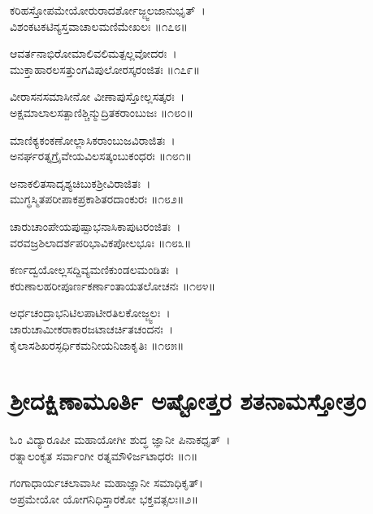	ಕರಿಹಸ್ತೋಪಮೇಯೋರುರಾದರ್ಶೋಜ್ಜ್ವಲಜಾನುಭೃತ್~।\\
	ವಿಶಂಕಟಕಟಿನ್ಯಸ್ತವಾಚಾಲಮಣಿಮೇಖಲಃ ॥೧೭೮॥

ಆವರ್ತನಾಭಿರೋಮಾಲಿವಲಿಮತ್ಪಲ್ಲವೋದರಃ~।\\
ಮುಕ್ತಾಹಾರಲಸತ್ತುಂಗವಿಪುಲೋರಸ್ಕರಂಜಿತಃ ॥೧೭೯॥

	ವೀರಾಸನಸಮಾಸೀನೋ ವೀಣಾಪುಸ್ತೋಲ್ಲಸತ್ಕರಃ~।\\
	ಅಕ್ಷಮಾಲಾಲಸತ್ಪಾಣಿಶ್ಚಿನ್ಮುದ್ರಿತಕರಾಂಬುಜಃ ॥೧೮೦॥

ಮಾಣಿಕ್ಯಕಂಕಣೋಲ್ಲಾಸಿಕರಾಂಬುಜವಿರಾಜಿತಃ~।\\
ಅನರ್ಘರತ್ನಗ್ರೈವೇಯವಿಲಸತ್ಕಂಬುಕಂಧರಃ ॥೧೮೧॥

	ಅನಾಕಲಿತಸಾದೃಶ್ಯಚಿಬುಕಶ್ರೀವಿರಾಜಿತಃ~।\\
	ಮುಗ್ಧಸ್ಮಿತಪರೀಪಾಕಪ್ರಕಾಶಿತರದಾಂಕುರಃ ॥೧೮೨॥

ಚಾರುಚಾಂಪೇಯಪುಷ್ಪಾಭನಾಸಿಕಾಪುಟರಂಜಿತಃ~।\\
ವರವಜ್ರಶಿಲಾದರ್ಶಪರಿಭಾವಿಕಪೋಲಭೂಃ ॥೧೮೩॥

	ಕರ್ಣದ್ವಯೋಲ್ಲಸದ್ದಿವ್ಯಮಣಿಕುಂಡಲಮಂಡಿತಃ~।\\
	ಕರುಣಾಲಹರೀಪೂರ್ಣಕರ್ಣಾಂತಾಯತಲೋಚನಃ ॥೧೮೪॥

ಅರ್ಧಚಂದ್ರಾಭನಿಟಿಲಪಾಟೀರತಿಲಕೋಜ್ಜ್ವಲಃ~।\\
ಚಾರುಚಾಮೀಕರಾಕಾರಜಟಾಚರ್ಚಿತಚಂದನಃ~।\\
ಕೈಲಾಸಶಿಖರಸ್ಫರ್ಧಿಕಮನೀಯನಿಜಾಕೃತಿಃ ॥೧೮೫॥
\section{ಶ್ರೀದಕ್ಷಿಣಾಮೂರ್ತಿ ಅಷ್ಟೋತ್ತರ ಶತನಾಮಸ್ತೋತ್ರಂ }

ಓಂ ವಿದ್ಯಾರೂಪೀ ಮಹಾಯೋಗೀ ಶುದ್ಧ ಜ್ಞಾನೀ ಪಿನಾಕಧೃತ್~।\\
ರತ್ನಾಲಂಕೃತ ಸರ್ವಾಂಗೀ ರತ್ನಮೌಳಿರ್ಜಟಾಧರಃ ॥೧॥

ಗಂಗಾಧಾರ್ಯಚಲಾವಾಸೀ ಮಹಾಜ್ಞಾನೀ ಸಮಾಧಿಕೃತ್।\\
ಅಪ್ರಮೇಯೋ ಯೋಗನಿಧಿಸ್ತಾರಕೋ ಭಕ್ತವತ್ಸಲಃ॥೨॥


